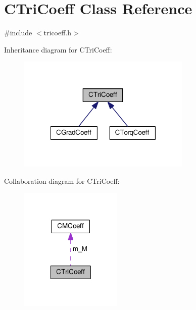 \hypertarget{classCTriCoeff}{\section{C\-Tri\-Coeff Class Reference}
\label{classCTriCoeff}
}


{\ttfamily \#include $<$tricoeff.\-h$>$}



Inheritance diagram for C\-Tri\-Coeff\-:\nopagebreak
\begin{figure}[H]
\begin{center}
\leavevmode
\includegraphics[width=235pt]{classCTriCoeff__inherit__graph}
\end{center}
\end{figure}


Collaboration diagram for C\-Tri\-Coeff\-:\nopagebreak
\begin{figure}[H]
\begin{center}
\leavevmode
\includegraphics[width=138pt]{classCTriCoeff__coll__graph}
\end{center}
\end{figure}
